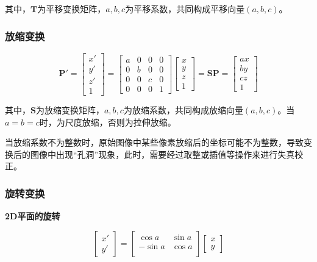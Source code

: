 \documentclass[cn, blue, normal, 12pt]{elegantnote}
\begin{document}
其中，$\bm{T}$为平移变换矩阵，$a,b,c$为平移系数，共同构成平移向量$(a,b,c)$。

\subsubsection{放缩变换}

\begin{equation}
    \bm{P'}=\left[
        \begin{array}{c}
            x' \\ y' \\ z' \\ 1
        \end{array}
    \right]=\left[
        \begin{array}{cccc}
            a & 0 & 0 & 0 \\
            0 & b & 0 & 0 \\
            0 & 0 & c & 0 \\
            0 & 0 & 0 & 1
        \end{array}
    \right]\left[
        \begin{array}{c}
            x \\ y \\ z \\ 1
        \end{array}
    \right]=\bm{SP}=\left[
        \begin{array}{c}
            ax \\ by \\ cz \\ 1
        \end{array}
    \right]
\end{equation}

其中，$\bm{S}$为放缩变换矩阵，$a,b,c$为放缩系数，共同构成放缩向量$(a,b,c)$。当$a=b=c$时，为尺度放缩，否则为拉伸放缩。

当放缩系数不为整数时，原始图像中某些像素放缩后的坐标可能不为整数，导致变换后的图像中出现“孔洞”现象，此时，需要经过取整或插值等操作来进行失真校正。

\subsubsection{旋转变换}

\textbf{2D平面的旋转}

\begin{equation}
    \left[
        \begin{array}{c}
            x' \\ y' 
        \end{array}
    \right]=\left[
        \begin{array}{cc}
            \cos{a}  & \sin{a} \\
            -\sin{a} & \cos{a} \\
        \end{array}
    \right]\left[
        \begin{array}{c}
            x \\ y 
        \end{array}
    \right]
\end{equation}
\end{document}
